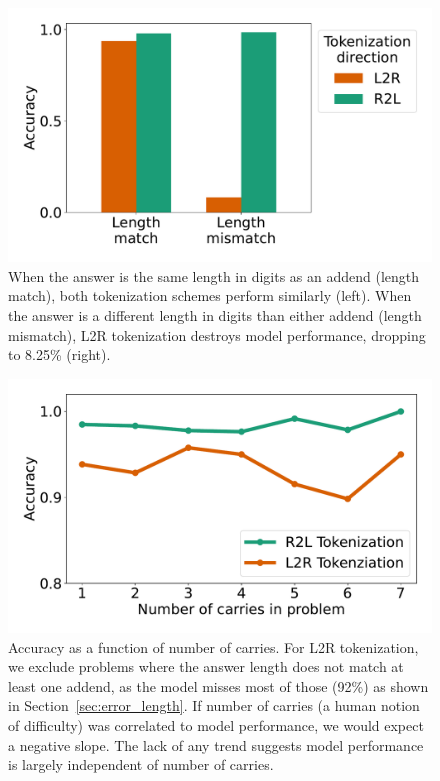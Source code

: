\documentclass{article}
\theoremstyle{plain}
\theoremstyle{definition}
\theoremstyle{remark}
\begin{document}
\begin{figure}
    \centering
    \includegraphics[width=\columnwidth]{figures/answer_length_error.pdf}
    \vspace{-3em}
    \caption{When the answer is the same length in digits as an addend (length match), both tokenization schemes perform similarly (left). When the answer is a different length in digits than either addend (length mismatch), L2R tokenization destroys model performance, dropping to 8.25\% (right).}
    \vspace{-0.5em}
    \label{fig:answer_length}
\end{figure}

\begin{figure}
    \centering
    \includegraphics[width=\columnwidth]{figures/num_carries.pdf}
    \vspace{-3em}
    \caption{Accuracy as a function of number of carries. For L2R tokenization, we exclude problems where the answer length does not match at least one addend, as the model misses most of those (92\%) as shown in Section~\ref{sec:error_length}. If number of carries (a human notion of difficulty) was correlated to model performance, we would expect a negative slope. The lack of any trend suggests model performance is largely independent of number of carries.}
    \vspace{-1.5em}
    \label{fig:carries}
\end{figure}
\end{document}

